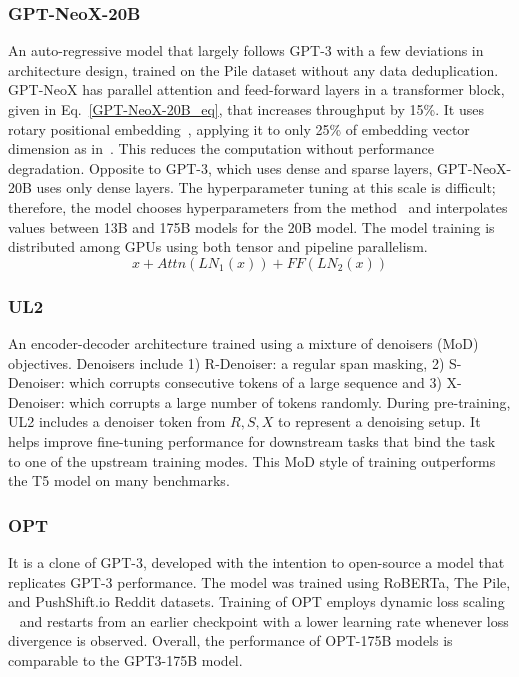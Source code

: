 \subsubsection{GPT-NeoX-20B~\cite{GPT_NeoX}}
An auto-regressive model that largely follows GPT-3 with a few deviations in architecture design, trained on the Pile dataset without any data deduplication. GPT-NeoX has parallel attention and feed-forward layers in a transformer block, given in Eq.~\ref{GPT-NeoX-20B_eq}, that increases throughput by 15\%. It uses rotary positional embedding~\cite{su2021roformer}, applying it to only 25\% of embedding vector dimension as in~\cite{GPT_J_6B}. This reduces the computation without performance degradation. Opposite to GPT-3, which uses dense and sparse layers, GPT-NeoX-20B uses only dense layers. The hyperparameter tuning at this scale is difficult; therefore, the model chooses hyperparameters from the method~\cite{GPT-3} and interpolates values between 13B and 175B models for the 20B model. The model training is distributed among GPUs using both tensor and pipeline parallelism.   
\begin{equation}
x + Attn(LN_1(x)) + FF(LN_2(x))
\label{GPT-NeoX-20B_eq}
\end{equation}

\subsubsection{UL2~\cite{UL2}}
An encoder-decoder architecture trained using a mixture of denoisers (MoD) objectives. Denoisers include 1) R-Denoiser: a regular span masking, 2) S-Denoiser: which corrupts consecutive tokens of a large sequence and 3) X-Denoiser: which corrupts a large number of tokens randomly. During pre-training, UL2 includes a denoiser token from ${R, S, X}$ to represent a denoising setup. It helps improve fine-tuning performance for downstream tasks that bind the task to one of the upstream training modes. This MoD style of training outperforms the T5 model on many benchmarks.   

\subsubsection{OPT~\cite{OPT}}
It is a clone of GPT-3, developed with the intention to open-source a model that replicates GPT-3 performance. The model was trained using RoBERTa, The Pile, and PushShift.io Reddit datasets. Training of OPT employs dynamic loss scaling ~\cite{S_mixed_precision} and restarts from an earlier checkpoint with a lower learning rate whenever loss divergence is observed. Overall, the performance of OPT-175B models is comparable to the GPT3-175B model.

